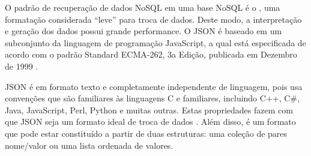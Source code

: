 O padrão de recuperação de dados NoSQL em uma base NoSQL é o  , uma formatação considerada “leve” para troca de dados. Deste modo, a interpretação e geração dos dados possui grande performance. O JSON é baseado em um subconjunto da linguagem de programação JavaScript, a qual está especificada de acordo com o padrão Standard ECMA-262, 3a Edição, publicada em Dezembro de 1999 \cite{JSON}. 

JSON é em formato texto e completamente independente de linguagem, pois usa convenções que são familiares às linguagens C e familiares, incluindo C++, C\#, Java, JavaScript, Perl, Python e muitas outras. Estas propriedades fazem com que JSON seja um formato ideal de troca de dados \cite{JSON}. Além disso, é um formato que pode estar constituído a partir de duas estruturas: uma coleção de pares nome/valor ou uma lista ordenada de valores.